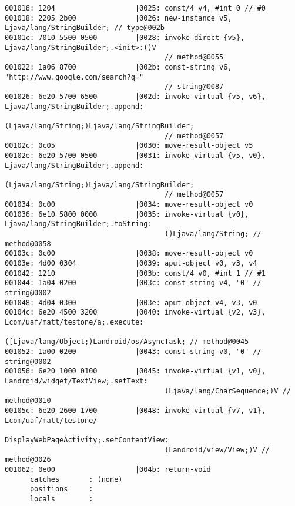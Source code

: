 \begin{lstlisting}
001016: 1204                   |0025: const/4 v4, #int 0 // #0
001018: 2205 2b00              |0026: new-instance v5, Ljava/lang/StringBuilder; // type@002b
00101c: 7010 5500 0500         |0028: invoke-direct {v5}, Ljava/lang/StringBuilder;.<init>:()V
                                      // method@0055
001022: 1a06 8700              |002b: const-string v6, "http://www.google.com/search?q="
                                      // string@0087
001026: 6e20 5700 6500         |002d: invoke-virtual {v5, v6}, Ljava/lang/StringBuilder;.append:
                                      (Ljava/lang/String;)Ljava/lang/StringBuilder;
                                      // method@0057
00102c: 0c05                   |0030: move-result-object v5
00102e: 6e20 5700 0500         |0031: invoke-virtual {v5, v0}, Ljava/lang/StringBuilder;.append:
                                      (Ljava/lang/String;)Ljava/lang/StringBuilder;
                                      // method@0057
001034: 0c00                   |0034: move-result-object v0
001036: 6e10 5800 0000         |0035: invoke-virtual {v0}, Ljava/lang/StringBuilder;.toString:
                                      ()Ljava/lang/String; // method@0058
00103c: 0c00                   |0038: move-result-object v0
00103e: 4d00 0304              |0039: aput-object v0, v3, v4
001042: 1210                   |003b: const/4 v0, #int 1 // #1
001044: 1a04 0200              |003c: const-string v4, "0" // string@0002
001048: 4d04 0300              |003e: aput-object v4, v3, v0
00104c: 6e20 4500 3200         |0040: invoke-virtual {v2, v3}, Lcom/uaf/matt/testone/a;.execute:
                                      ([Ljava/lang/Object;)Landroid/os/AsyncTask; // method@0045
001052: 1a00 0200              |0043: const-string v0, "0" // string@0002
001056: 6e20 1000 0100         |0045: invoke-virtual {v1, v0}, Landroid/widget/TextView;.setText:
                                      (Ljava/lang/CharSequence;)V // method@0010
00105c: 6e20 2600 1700         |0048: invoke-virtual {v7, v1}, Lcom/uaf/matt/testone/
                                      DisplayWebPageActivity;.setContentView:
                                      (Landroid/view/View;)V // method@0026
001062: 0e00                   |004b: return-void
      catches       : (none)
      positions     :
      locals        :


\end{lstlisting}
